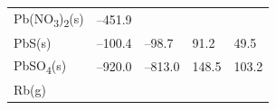 \documentclass[
]{book}
\theoremstyle{definition}
\theoremstyle{definition}
\theoremstyle{definition}
\theoremstyle{remark}
\begin{document}
\begin{longtable}[]{@{}lllll@{}}
\begin{minipage}[t]{0.10\columnwidth}
Pb(NO\textsubscript{3})\textsubscript{2}(s)\strut
\end{minipage} & \begin{minipage}[t]{0.19\columnwidth}\raggedright
--451.9\strut
\end{minipage} & \begin{minipage}[t]{0.20\columnwidth}\raggedright
\strut
\end{minipage} & \begin{minipage}[t]{0.18\columnwidth}\raggedright
\strut
\end{minipage} & \begin{minipage}[t]{0.18\columnwidth}\raggedright
\strut
\end{minipage}\tabularnewline
\begin{minipage}[t]{0.10\columnwidth}\raggedright
PbS(s)\strut
\end{minipage} & \begin{minipage}[t]{0.19\columnwidth}\raggedright
--100.4\strut
\end{minipage} & \begin{minipage}[t]{0.20\columnwidth}\raggedright
--98.7\strut
\end{minipage} & \begin{minipage}[t]{0.18\columnwidth}\raggedright
91.2\strut
\end{minipage} & \begin{minipage}[t]{0.18\columnwidth}\raggedright
49.5\strut
\end{minipage}\tabularnewline
\begin{minipage}[t]{0.10\columnwidth}\raggedright
PbSO\textsubscript{4}(s)\strut
\end{minipage} & \begin{minipage}[t]{0.19\columnwidth}\raggedright
--920.0\strut
\end{minipage} & \begin{minipage}[t]{0.20\columnwidth}\raggedright
--813.0\strut
\end{minipage} & \begin{minipage}[t]{0.18\columnwidth}\raggedright
148.5\strut
\end{minipage} & \begin{minipage}[t]{0.18\columnwidth}\raggedright
103.2\strut
\end{minipage}\tabularnewline
\begin{minipage}[t]{0.10\columnwidth}\raggedright
Rb(g)\strut
\end{minipage} & \begin{minipage}[t]{0.19\columnwidth}\raggedright

\end{minipage}
\end{longtable}
\end{document}
